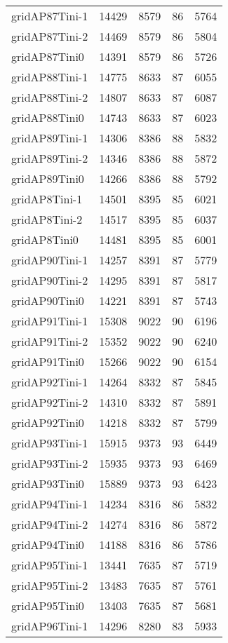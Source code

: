 \documentclass[../../../thesis.tex]{subfiles}
\begin{document}
\begin{longtable}{lrrrr}
gridAP87Tini-1 & 14429 & 8579 & 86 & 5764 \\
gridAP87Tini-2 & 14469 & 8579 & 86 & 5804 \\
gridAP87Tini0 & 14391 & 8579 & 86 & 5726 \\
gridAP88Tini-1 & 14775 & 8633 & 87 & 6055 \\
gridAP88Tini-2 & 14807 & 8633 & 87 & 6087 \\
gridAP88Tini0 & 14743 & 8633 & 87 & 6023 \\
gridAP89Tini-1 & 14306 & 8386 & 88 & 5832 \\
gridAP89Tini-2 & 14346 & 8386 & 88 & 5872 \\
gridAP89Tini0 & 14266 & 8386 & 88 & 5792 \\
gridAP8Tini-1 & 14501 & 8395 & 85 & 6021 \\
gridAP8Tini-2 & 14517 & 8395 & 85 & 6037 \\
gridAP8Tini0 & 14481 & 8395 & 85 & 6001 \\
gridAP90Tini-1 & 14257 & 8391 & 87 & 5779 \\
gridAP90Tini-2 & 14295 & 8391 & 87 & 5817 \\
gridAP90Tini0 & 14221 & 8391 & 87 & 5743 \\
gridAP91Tini-1 & 15308 & 9022 & 90 & 6196 \\
gridAP91Tini-2 & 15352 & 9022 & 90 & 6240 \\
gridAP91Tini0 & 15266 & 9022 & 90 & 6154 \\
gridAP92Tini-1 & 14264 & 8332 & 87 & 5845 \\
gridAP92Tini-2 & 14310 & 8332 & 87 & 5891 \\
gridAP92Tini0 & 14218 & 8332 & 87 & 5799 \\
gridAP93Tini-1 & 15915 & 9373 & 93 & 6449 \\
gridAP93Tini-2 & 15935 & 9373 & 93 & 6469 \\
gridAP93Tini0 & 15889 & 9373 & 93 & 6423 \\
gridAP94Tini-1 & 14234 & 8316 & 86 & 5832 \\
gridAP94Tini-2 & 14274 & 8316 & 86 & 5872 \\
gridAP94Tini0 & 14188 & 8316 & 86 & 5786 \\
gridAP95Tini-1 & 13441 & 7635 & 87 & 5719 \\
gridAP95Tini-2 & 13483 & 7635 & 87 & 5761 \\
gridAP95Tini0 & 13403 & 7635 & 87 & 5681 \\
gridAP96Tini-1 & 14296 & 8280 & 83 & 5933 \\

\end{longtable}
\end{document}
